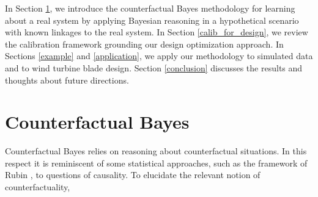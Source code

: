 \documentclass[twocolumn,10pt]{asme2ej}
\begin{document}
%
In Section \ref{counterfactual_bayes}, we introduce the counterfactual Bayes methodology for learning about a real system by applying Bayesian reasoning in a hypothetical scenario with known linkages to the real system.
%
In Section \ref{calib_for_design}, we review the calibration framework grounding our design optimization approach. 
%
In Sections \ref{example} and \ref{application}, we apply our methodology to simulated data and to wind turbine blade design.
%
%
Section \ref{conclusion} discusses the results and thoughts about future directions.
%

%
\section{Counterfactual Bayes}\label{counterfactual_bayes}
%
Counterfactual Bayes relies on reasoning about counterfactual situations.
%
In this respect it is reminiscent of some statistical approaches, such as the framework of Rubin \cite{Rubin1974}, to questions of causality.
%
To elucidate the relevant notion of counterfactuality, 
\end{document}
